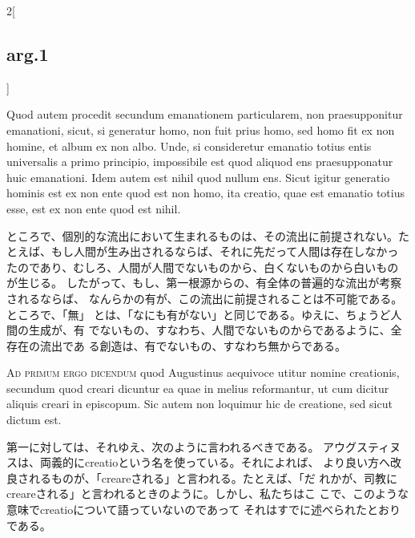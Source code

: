 \documentclass[paper=a4paper,fontsize=10pt,jafontsize=9pt,titlepage]{jlreq}
\begin{document}
\begin{paracol}{2}[\subsection{arg.1}]
\switchcolumn*

Quod autem procedit secundum emanationem particularem, non
 praesupponitur emanationi, sicut, si generatur homo, non fuit prius
 homo, sed homo fit ex non homine, et album ex non albo. Unde, si
 consideretur emanatio totius entis universalis a primo principio,
 impossibile est quod aliquod ens praesupponatur huic emanationi. Idem
 autem est nihil quod nullum ens. Sicut igitur generatio hominis est ex
 non ente quod est non homo, ita creatio, quae est emanatio totius esse,
 est ex non ente quod est nihil.

\switchcolumn

ところで、個別的な流出において生まれるものは、その流出に前提されない。た
 とえば、もし人間が生み出されるならば、それに先だって人間は存在しなかっ
 たのであり、むしろ、人間が人間でないものから、白くないものから白いもの
 が生じる。
したがって、もし、第一根源からの、有全体の普遍的な流出が考察されるならば、
 なんらかの有が、この流出に前提されることは不可能である。ところで、「無」
 とは、「なにも有がない」と同じである。ゆえに、ちょうど人間の生成が、有
 でないもの、すなわち、人間でないものからであるように、全存在の流出であ
 る創造は、有でないもの、すなわち無からである。

\switchcolumn*[\subsection{ad.1}]

{\scshape Ad primum ergo dicendum} quod Augustinus
 aequivoce utitur nomine creationis, secundum quod creari dicuntur ea
 quae in melius reformantur, ut cum dicitur aliquis creari in
 episcopum. Sic autem non loquimur hic de creatione, sed sicut dictum
 est.

\switchcolumn

第一に対しては、それゆえ、次のように言われるべきである。
アウグスティヌスは、両義的にcreatioという名を使っている。それによれば、
 より良い方へ改良されるものが、「creareされる」と言われる。たとえば、「だ
 れかが、司教にcreareされる」と言われるときのように。しかし、私たちはこ
 こで、このような意味でcreatioについて語っていないのであって
それはすでに述べられたとおりである。

\switchcolumn*[\subsection{ad.2}]


\end{paracol}
\end{document}
